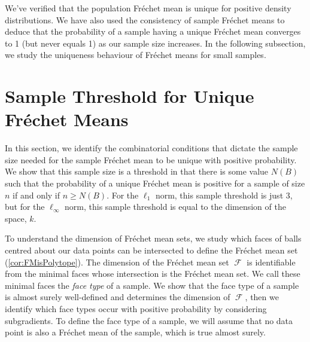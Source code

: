 \documentclass[10pt]{article}
\theoremstyle{definition}
\theoremstyle{remark}
\DeclareMathOperator{\FMset}{\mathcal{F}}
\begin{document}
	We've verified that the population Fr\'echet mean is unique for positive density distributions. We have also used the consistency of sample Fr\'echet means to deduce that the probability of a sample having a unique Fr\'echet mean converges to 1 (but never equals 1) as our sample size increases. In the following subsection, we study the uniqueness behaviour of Fr\'echet means for small samples.
	
	\section{Sample Threshold for Unique Fr\'echet Means}
	\label{sec:FM_uniqueness}
	
	
	In this section, we identify the combinatorial conditions that dictate the sample size needed for the sample Fr\'echet mean to be unique with positive probability. We show that this sample size is a threshold in that there is some value $N(B)$ such that the probability of a unique Fr\'echet mean is positive for a sample of size $n$ if and only if $n \geq N(B)$. For the $\ell_1$ norm, this sample threshold is just 3, but for the $\ell_{\infty}$ norm, this sample threshold is equal to the dimension of the space, $k$.
	
	To understand the dimension of Fr\'echet mean sets, we study which faces of balls centred about our data points can be intersected to define the Fr\'echet mean set (\cref{cor:FMisPolytope}). The dimension of the Fr\'echet mean set $\FMset$ is identifiable from the minimal faces whose intersection is the Fr\'echet mean set. We call these minimal faces the \emph{face type} of a sample. We show that the face type of a sample is almost surely well-defined and determines the dimension of $\FMset$, then we identify which face types occur with positive probability by considering subgradients. To define the face type of a sample, we will assume that no data point is also a Fr\'echet mean of the sample, which is true almost surely.
	
\end{document}
